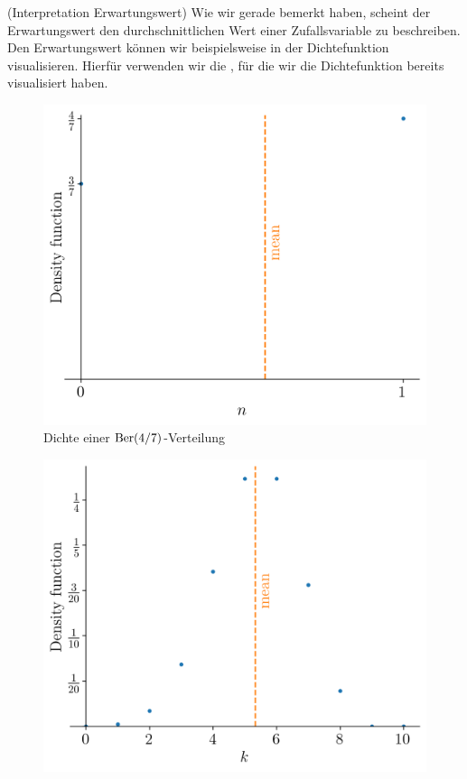 \begin{Beispiel}{(Interpretation Erwartungswert)}
\hypertarget{Bsp:InterpretErw}{}Wie wir gerade bemerkt haben, scheint der Erwartungswert den durchschnittlichen Wert einer Zufallsvariable zu beschreiben. Den Erwartungswert können wir beispielsweise in der Dichtefunktion visualisieren. Hierfür verwenden wir die \hyperlink{Bsp:DichteBild}{}, für die wir die Dichtefunktion bereits visualisiert haben.\\
\begin{minipage}{0.5\linewidth}
\begin{figure}[H]
\begin{center}
\includegraphics[width=\linewidth]{./Section/Momente/Erwartungswert Bernoulli.png}
\caption{\centering Dichte einer $\operatorname{Ber}(4/7)$-Verteilung}
\end{center}
\end{figure}
\end{minipage}
\begin{minipage}{0.5\linewidth}
\begin{figure}[H]
\begin{center}
\includegraphics[width=\linewidth]{./Section/Momente/Erwartungswert Binomial.png}

\end{center}
\end{figure}
\end{minipage}
\end{Beispiel}
